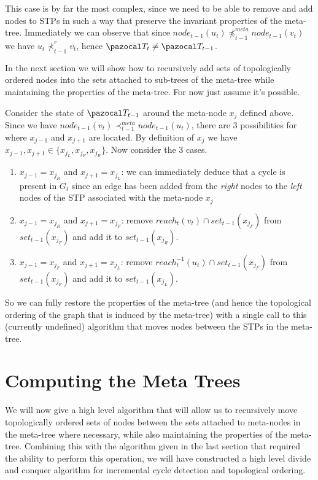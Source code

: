 \documentclass{report}
\begin{document}
This case is by far the most complex, since we need to be able to remove and add nodes to STPs in such a way that preserve the invariant properties of the meta-tree. Immediately we can observe that since $node_{t-1}(u_t) \npreceq^{meta}_{t-1} node_{t-1}(v_t)$ we have $u_t \nprec^{r}_{t-1} v_t$, hence $\pazocal T_t \neq \pazocal T_{t-1}$.

In the next section we will show how to recursively add sets of topologically ordered nodes into the sets attached to sub-trees of the meta-tree while maintaining the properties of the meta-tree. For now just assume it's possible.

Consider the state of $\pazocal T_{t-1}$ around the meta-node $x_j$ defined above. Since we have $node_{t-1}(v_t) \prec_{t-1}^{meta} node_{t-1}(u_t)$, there are 3 possibilities for where $x_{j-1}$ and $x_{j+1}$ are located. By definition of $x_j$ we have $x_{j-1}, x_{j+1} \in \{ x_{j}_{L}, x_{j}_{F}, x_{j}_{R} \}$. Now consider the 3 cases.

\begin{enumerate}
    \item $x_{j-1}=x_{j}_{R}$ and $x_{j+1}=x_{j}_{L}$: we can immediately deduce that a cycle is present in $G_t$ since an edge has been added from the \textit{right} nodes to the \textit{left} nodes of the STP associated with the meta-node $x_{j}$
    
    \item $x_{j-1}=x_{j}_{R}$ and $x_{j+1}=x_{j}_{F}$: remove $reach_t(v_t) \cap set_{t-1}(x_{j}_{F})$ from $set_{t-1}(x_{j}_{F})$ and add it to $set_{t-1}(x_{j}_{R})$.
    
    \item $x_{j-1}=x_{j}_{F}$ and $x_{j+1}=x_{j}_{L}$: remove $reach_t^{-1}(u_t) \cap set_{t-1}(x_{j}_{F})$ from $set_{t-1}(x_{j}_{F})$ and add it to $set_{t-1}(x_{j}_{L})$.
\end{enumerate}

So we can fully restore the properties of the meta-tree (and hence the topological ordering of the graph that is induced by the meta-tree) with a single call to this (currently undefined) algorithm that moves nodes between the STPs in the meta-tree.

\section{Computing the Meta Trees}

We will now give a high level algorithm that will allow us to recursively move topologically ordered sets of nodes between the sets attached to meta-nodes in the meta-tree where necessary, while also maintaining the properties of the meta-tree. Combining this with the algorithm given in the last section that required the ability to perform this operation, we will have constructed a high level divide and conquer algorithm for incremental cycle detection and topological ordering.
\end{document}
